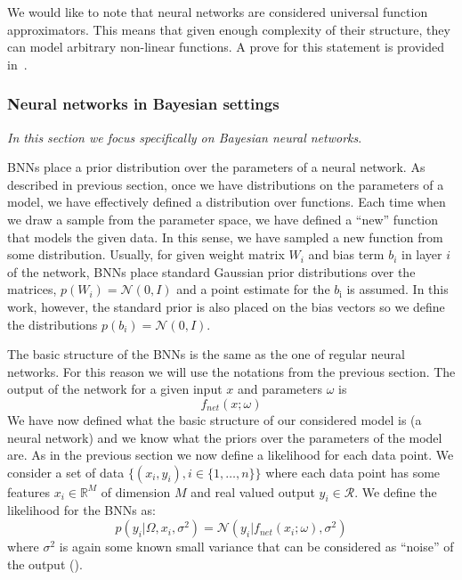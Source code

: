 \documentclass[12pt,a4paper,twoside]{scrartcl}
\numberwithin{equation}{section}
\begin{document}
We would like to note that neural networks are considered universal function approximators. This means that given enough complexity of their structure, they can model arbitrary non-linear functions. A prove for this statement is provided in~\cite{hornik1989}.
\subsubsection{Neural networks in Bayesian settings}\label{sec:nn-in-bayesian}
\noindent\emph{In this section we focus specifically on Bayesian neural networks}.

BNNs place a prior distribution over the parameters of a neural network. As described in previous section, once we have distributions on the parameters of a model, we have effectively defined a distribution over functions. Each time when we draw a sample from the parameter space, we have defined a ``new'' function that models the given data. In this sense, we have sampled a new function from some distribution. Usually, for given weight matrix \(W_i\) and bias term \(b_i\) in layer \(i\) of the network, BNNs place standard Gaussian prior distributions over the matrices, \(p(W_i)=\mathcal{N}(0,I)\) and a point estimate for the \(b_{\text{i}}\) is assumed. In this work, however, the standard prior is also placed on the bias vectors so we define the distributions \(p(b_i)=\mathcal{N}(0,I)\).

The basic structure of the BNNs is the same as the one of regular neural networks. For this reason we will use the notations from the previous section. The output of the network for a given input \(x\) and parameters \(\omega\) is
\begin{equation}
  f_{net}(x;\omega)
\end{equation}
We have now defined what the basic structure of our considered model is (a neural network) and we know what the priors over the parameters of the model are. As in the previous section we now define a likelihood for each data point. We consider a set of data \(\{(x_i, y_i), i\in\{1,\ldots ,n\} \}\) where each data point has some features \(x_i\in\mathbb{R}^M\) of dimension \(M\) and real valued output \(y_i\in\mathcal{R}\). We define the likelihood for the BNNs as:
\begin{equation}
  p(y_i|\Omega, x_i, \sigma^2) = \mathcal{N}(y_i |f_{net}(x_i;\omega), \sigma^2)
\end{equation}
where \(\sigma^{\text{2}}\) is again some known small variance that can be considered as ``noise'' of the output (\cite{gal2016}).
\end{document}
